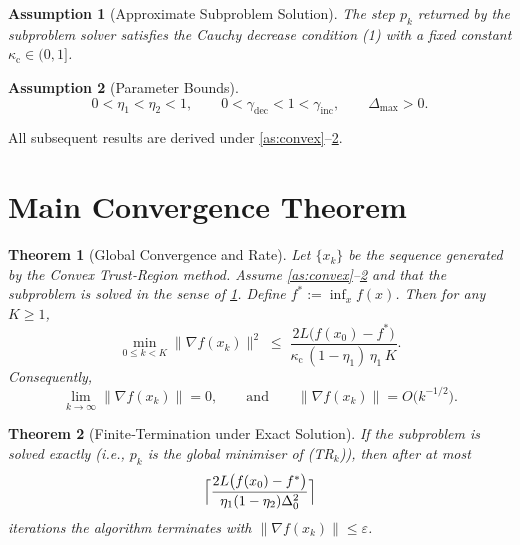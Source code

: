 \documentclass{article}
\newtheorem{theorem}{Theorem}
\newtheorem{assumption}{Assumption}
\begin{document}
\begin{assumption}[Approximate Subproblem Solution]\label{as:subprob}
The step $p_{k}$ returned by the subproblem solver satisfies the Cauchy decrease
condition (1) with a fixed constant $\kappa_{\mathrm{c}}\in(0,1]$.
\end{assumption}

\begin{assumption}[Parameter Bounds]\label{as:params}
\[
0<\eta_{1}<\eta_{2}<1,\qquad
0<\gamma_{\mathrm{dec}}<1<\gamma_{\mathrm{inc}},\qquad
\Delta_{\max}>0.
\tag{A4}
\]
\end{assumption}

All subsequent results are derived under \ref{as:convex}–\ref{as:params}.

\section*{Main Convergence Theorem}
\begin{theorem}[Global Convergence and Rate]\label{thm:main}
Let $\{x_{k}\}$ be the sequence generated by the Convex Trust‑Region method.
Assume \ref{as:convex}–\ref{as:params} and that the subproblem is solved
in the sense of \ref{as:subprob}.
Define $f^{*}:=\inf_{x}f(x)$. Then for any $K\ge1$,
\[
\min_{0\le k<K}\|\nabla f(x_{k})\|^{2}
\;\le\;
\frac{2L\bigl(f(x_{0})-f^{*}\bigr)}
{\kappa_{\mathrm{c}}\,(1-\eta_{1})\,\eta_{1}\,K}.
\tag{5}
\]
Consequently,
\[
\lim_{k\to\infty}\|\nabla f(x_{k})\|=0,
\qquad
\text{and}\qquad
\|\nabla f(x_{k})\|=O\!\bigl(k^{-1/2}\bigr).
\]
\end{theorem}

\begin{theorem}[Finite‑Termination under Exact Solution]\label{thm:exact}
If the subproblem is solved exactly (i.e., $p_{k}$ is the global minimiser of (TR$_k$)),
then after at most
\[
\Bigl\lceil \frac{2L\bigl(f(x_{0})-f^{*}\bigr)}{\eta_{1}(1-\eta_{2})\Delta_{0}^{2}} \Bigr\rceil
\]
iterations the algorithm terminates with $\| \nabla f(x_{k})\|\le\varepsilon$.
\end{theorem}

\end{document}
